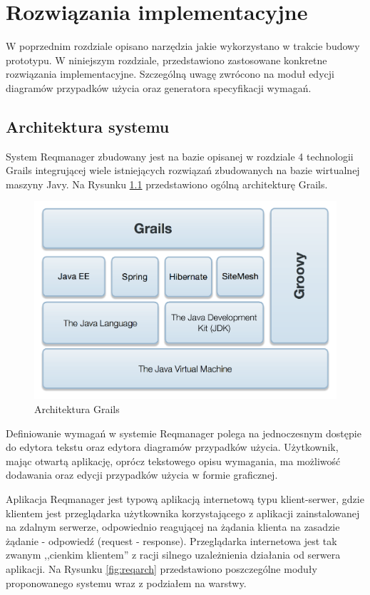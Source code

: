\chapter{Rozwiązania implementacyjne}
  
  W poprzednim rozdziale opisano narzędzia jakie wykorzystano w trakcie budowy prototypu. W niniejszym rozdziale, przedstawiono zastosowane konkretne rozwiązania implementacyjne. Szczególną uwagę zwrócono na moduł edycji diagramów przypadków użycia oraz generatora specyfikacji wymagań.

  \section{Architektura systemu}

    System Reqmanager zbudowany jest na bazie opisanej w rozdziale 4 technologii Grails integrującej wiele istniejących rozwiązań zbudowanych na bazie wirtualnej maszyny Javy. Na Rysunku \ref{fig:techstack} przedstawiono ogólną architekturę Grails.

    \begin{figure}[h]
      \centering
      \includegraphics[width=1.0\textwidth]{img/grails-stack-rev2.pdf}
      \caption{Architektura Grails}
      \label{fig:techstack}
    \end{figure}
     
    Definiowanie wymagań w systemie Reqmanager polega na jednoczesnym dostępie do edytora tekstu oraz edytora diagramów przypadków użycia. Użytkownik, mając otwartą aplikację, oprócz tekstowego opisu wymagania, ma możliwość dodawania oraz edycji przypadków użycia w formie graficznej.

    Aplikacja Reqmanager jest typową aplikacją internetową typu klient-serwer, gdzie klientem jest przeglądarka użytkownika korzystającego z aplikacji zainstalowanej na zdalnym serwerze, odpowiednio reagującej na żądania klienta na zasadzie żądanie - odpowiedź (request - response). Przeglądarka internetowa jest tak zwanym ,,cienkim klientem'' z racji silnego uzależnienia działania od serwera aplikacji. Na Rysunku \ref{fig:reqarch} przedstawiono poszczególne moduły proponowanego systemu wraz z podziałem na warstwy.
 
